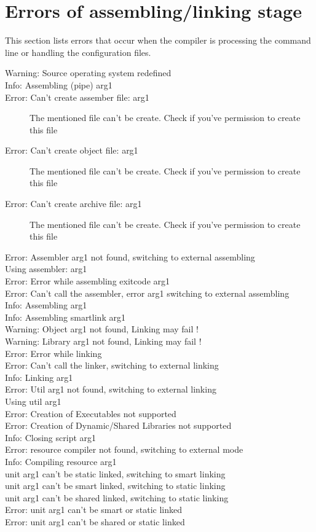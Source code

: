  \section{Errors of assembling/linking stage}
 This section lists errors that occur when the compiler is processing the
 command line or handling the configuration files.
 \begin{description}
\item [Warning: Source operating system redefined]
\item [Info: Assembling (pipe) arg1]
\item [Error: Can't create assember file: arg1]
 The mentioned file can't be create. Check if you've
 permission to create this file
\item [Error: Can't create object file: arg1]
 The mentioned file can't be create. Check if you've
 permission to create this file
\item [Error: Can't create archive file: arg1]
 The mentioned file can't be create. Check if you've
 permission to create this file
\item [Error: Assembler arg1 not found, switching to external assembling]
\item [Using assembler: arg1]
\item [Error: Error while assembling exitcode arg1]
\item [Error: Can't call the assembler, error arg1 switching to external assembling]
\item [Info: Assembling arg1]
\item [Info: Assembling smartlink arg1]
\item [Warning: Object arg1 not found, Linking may fail !]
\item [Warning: Library arg1 not found, Linking may fail !]
\item [Error: Error while linking]
\item [Error: Can't call the linker, switching to external linking]
\item [Info: Linking arg1]
\item [Error: Util arg1 not found, switching to external linking]
\item [Using util arg1]
\item [Error: Creation of Executables not supported]
\item [Error: Creation of Dynamic/Shared Libraries not supported]
\item [Info: Closing script arg1]
\item [Error: resource compiler not found, switching to external mode]
\item [Info: Compiling resource arg1]
\item [unit arg1 can't be static linked, switching to smart linking]
\item [unit arg1 can't be smart linked, switching to static linking]
\item [unit arg1 can't be shared linked, switching to static linking]
\item [Error: unit arg1 can't be smart or static linked]
\item [Error: unit arg1 can't be shared or static linked]
\end{description}

